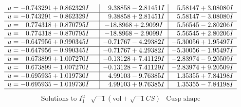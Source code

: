\documentclass[1p]{elsarticle_modified}
\theoremstyle{definition}
\newcommand{\I}{\sqrt{-1}}
\begin{document}
$$\begin{array}{c|c|c}
\begin{aligned}
u &= -0.743291 + 0.862329 I\end{aligned}
 & \phantom{-}9.38858 - 2.81451 I & \phantom{-}5.58147 + 3.08080 I \\ \hline\begin{aligned}
u &= -0.743291 - 0.862329 I\end{aligned}
 & \phantom{-}9.38858 + 2.81451 I & \phantom{-}5.58147 - 3.08080 I \\ \hline\begin{aligned}
u &= \phantom{-}0.774318 + 0.870795 I\end{aligned}
 & -18.8968 + 2.9099 I & \phantom{-}5.56545 - 2.80206 I \\ \hline\begin{aligned}
u &= \phantom{-}0.774318 - 0.870795 I\end{aligned}
 & -18.8968 - 2.9099 I & \phantom{-}5.56545 + 2.80206 I \\ \hline\begin{aligned}
u &= -0.647956 + 0.990345 I\end{aligned}
 & -0.71767 - 4.29382 I & -5.30056 + 1.95497 I \\ \hline\begin{aligned}
u &= -0.647956 - 0.990345 I\end{aligned}
 & -0.71767 + 4.29382 I & -5.30056 - 1.95497 I \\ \hline\begin{aligned}
u &= \phantom{-}0.673899 + 1.007270 I\end{aligned}
 & -0.13128 + 7.41129 I & -2.83974 - 9.20509 I \\ \hline\begin{aligned}
u &= \phantom{-}0.673899 - 1.007270 I\end{aligned}
 & -0.13128 - 7.41129 I & -2.83974 + 9.20509 I \\ \hline\begin{aligned}
u &= -0.695935 + 1.019730 I\end{aligned}
 & \phantom{-}4.99103 - 9.76385 I & \phantom{-}1.35355 + 7.84198 I \\ \hline\begin{aligned}
u &= -0.695935 - 1.019730 I\end{aligned}
 & \phantom{-}4.99103 + 9.76385 I & \phantom{-}1.35355 - 7.84198 I\\
 \hline 
 \end{array}$$\newpage$$\begin{array}{c|c|c}  
\text{Solutions to }I^u_{1}& \I (\text{vol} + \sqrt{-1}CS) & \text{Cusp shape}\\

\end{array}$$
\end{document}
